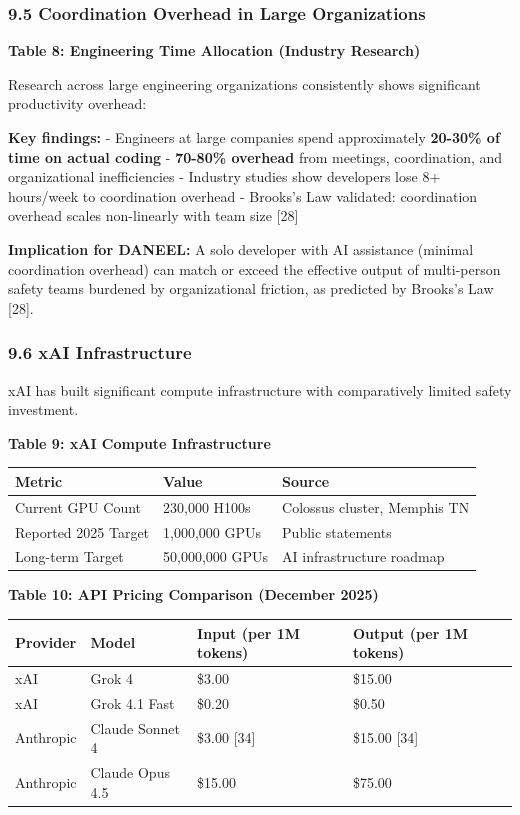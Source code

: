 \documentclass[
]{article}
\begin{document}
\hypertarget{coordination-overhead-in-large-organizations}{%
\subsubsection{9.5 Coordination Overhead in Large
Organizations}\label{coordination-overhead-in-large-organizations}}

\textbf{Table 8: Engineering Time Allocation (Industry Research)}

Research across large engineering organizations consistently shows
significant productivity overhead:

\textbf{Key findings:} - Engineers at large companies spend
approximately \textbf{20-30\% of time on actual coding} -
\textbf{70-80\% overhead} from meetings, coordination, and
organizational inefficiencies - Industry studies show developers lose 8+
hours/week to coordination overhead - Brooks's Law validated:
coordination overhead scales non-linearly with team size {[}28{]}

\textbf{Implication for DANEEL:} A solo developer with AI assistance
(minimal coordination overhead) can match or exceed the effective output
of multi-person safety teams burdened by organizational friction, as
predicted by Brooks's Law {[}28{]}.

\hypertarget{xai-infrastructure}{%
\subsubsection{9.6 xAI Infrastructure}\label{xai-infrastructure}}

xAI has built significant compute infrastructure with comparatively
limited safety investment.

\textbf{Table 9: xAI Compute Infrastructure}

\begin{longtable}[]{@{}lll@{}}
\toprule\noalign{}
Metric & Value & Source \\
\midrule\noalign{}
\endhead
\bottomrule\noalign{}
\endlastfoot
Current GPU Count & 230,000 H100s & Colossus cluster, Memphis TN \\
Reported 2025 Target & 1,000,000 GPUs & Public statements \\
Long-term Target & 50,000,000 GPUs & AI infrastructure roadmap \\
\end{longtable}

\textbf{Table 10: API Pricing Comparison (December 2025)}

\begin{longtable}[]{@{}llll@{}}
\toprule\noalign{}
Provider & Model & Input (per 1M tokens) & Output (per 1M tokens) \\
\midrule\noalign{}
\endhead
\bottomrule\noalign{}
\endlastfoot
xAI & Grok 4 & \$3.00 & \$15.00 \\
xAI & Grok 4.1 Fast & \$0.20 & \$0.50 \\
Anthropic & Claude Sonnet 4 & \$3.00 {[}34{]} & \$15.00 {[}34{]} \\
Anthropic & Claude Opus 4.5 & \$15.00 & \$75.00 \\
\end{longtable}
\end{document}
